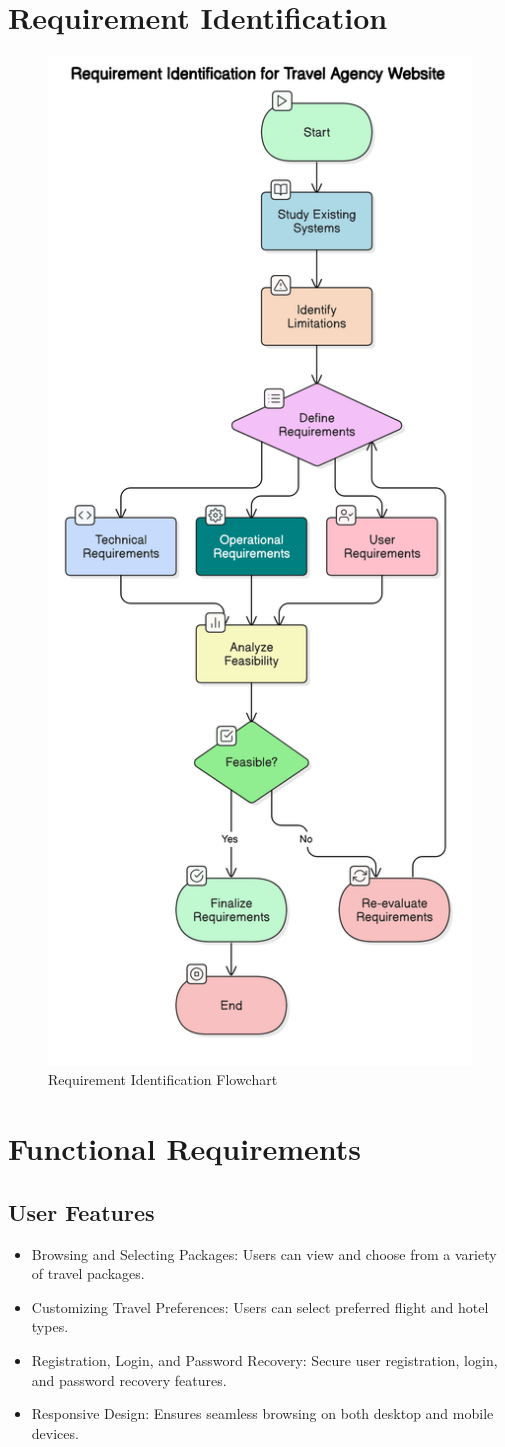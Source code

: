 \documentclass[12pt]{scrreprt}
\begin{document}
\vspace{1cm}

\section{Requirement Identification}
\begin{figure}[H]  %
    \centering
    \includegraphics[width=0.5\linewidth]{flow.png}
    \caption{Requirement Identification Flowchart}
    \label{fig:Requirement Identification Flowchart}
\end{figure}

\section{Functional Requirements}
\subsection{User Features}
\begin{itemize}
    \item Browsing and Selecting Packages: Users can view and choose from a variety of travel packages.
    \item Customizing Travel Preferences: Users can select preferred flight and hotel types.
    \item Registration, Login, and Password Recovery: Secure user registration, login, and password recovery features.
    \item Responsive Design: Ensures seamless browsing on both desktop and mobile devices.
\end{itemize}
\end{document}
